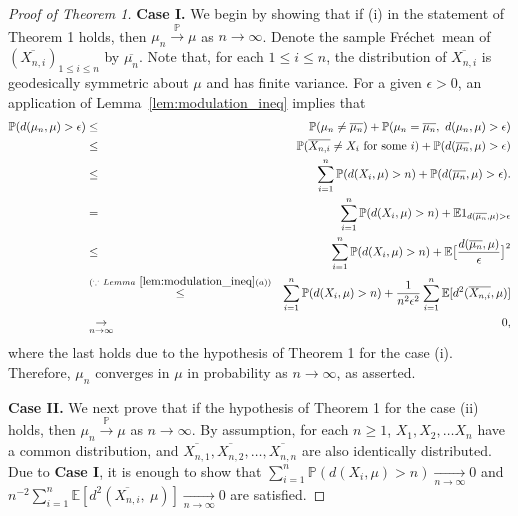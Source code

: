 \documentclass[preprint]{imsart}
\def\Frechet{Fr\'{e}chet}
\theoremstyle{plain}
\theoremstyle{remark}
\begin{document}
\begin{appendix}
\begin{proof}[Proof of Theorem 1]

\textbf{Case I.} We begin by showing that if (i) in the statement of Theorem 1 holds, then $\mu_n \overset{\mathbb{P}}{\to} \mu$ as $n \to \infty$. Denote the sample \Frechet\ mean of $(\overline{X_{n, i}})_{1\le i\le n}$ by $\overline{\mu_{n}}$. Note that, for each $1\le i\le n$, the distribution of $\overline{X_{n, i}}$ is geodesically symmetric about $\mu$ and has finite variance. For a given $\epsilon > 0$, an application of Lemma~\ref{lem:modulation_ineq} implies that
\begin{eqnarray*}
\mathbb{P}(d(\mu_n, \mu ) > \epsilon) &\le& \mathbb{P}(\mu_n \neq \overline{\mu_n}) + \mathbb{P}(\mu_n=\overline{\mu_n}, ~ d(\mu_{n}, \mu) > \epsilon) \\
&\le& \mathbb{P}(\overline{X_{n, i}} \neq X_i ~ \mbox{for some} ~ i) + \mathbb{P}(d(\overline{\mu_n}, \mu) > \epsilon) \\
&\le& \sum_{i=1}^{n}\mathbb{P}(d(X_i, \mu) > n) + \mathbb{P}(d(\overline{\mu_n}, \mu) > \epsilon). \\
&=& \sum_{i=1}^{n}\mathbb{P}(d(X_i, \mu) > n) + \mathbb{E}1_{d(\overline{\mu_n}, \mu) > \epsilon} \\
&\le& \sum_{i=1}^{n}\mathbb{P}(d(X_i, \mu) > n) + \mathbb{E}\big[\frac{d(\overline{\mu_{n}}, \mu)}{\epsilon}\big]^2 \\
&\overset{(\because ~ Lemma~\ref{lem:modulation_ineq}(a))}{\le}& \sum_{i=1}^{n}\mathbb{P}(d(X_i, \mu) > n) + \frac{1}{n^2\epsilon^2}\sum_{i=1}^{n}\mathbb{E}[d^2(\overline{X_{n, i}}, \mu)] \\
&\underset{n \to \infty}{\to}& 0,
\end{eqnarray*}
where the last holds due to the hypothesis of Theorem 1 for the case (i). Therefore, $\mu_n$ converges in $\mu$ in probability as $n\to \infty$, as asserted. 


\textbf{Case II.} We next prove that if the hypothesis of Theorem 1 for the case (ii) holds, then $\mu_n \overset{\mathbb{P}}{\to} \mu$ as $n \to \infty$. By assumption, for each $n\ge 1$, $X_{1}, X_{2}, \ldots X_{n}$ have a common distribution, and $\overline{X_{n,1}}, \overline{X_{n,2}}, \ldots, \overline{X_{n,n}}$ are also identically distributed. Due to \textbf{Case I}, it is enough to show that $\sum_{i=1}^{n} \mathbb{P}(d(X_i, \mu) > n) \underset{n \to \infty}{\to} 0$ and $n^{-2}\sum_{i=1}^{n}\mathbb{E}[d^2(\overline{X_{n, i}}, ~ \mu)] \underset{n \to \infty}{\to} 0$ are satisfied. 


\end{proof}
\end{appendix}
\end{document}
